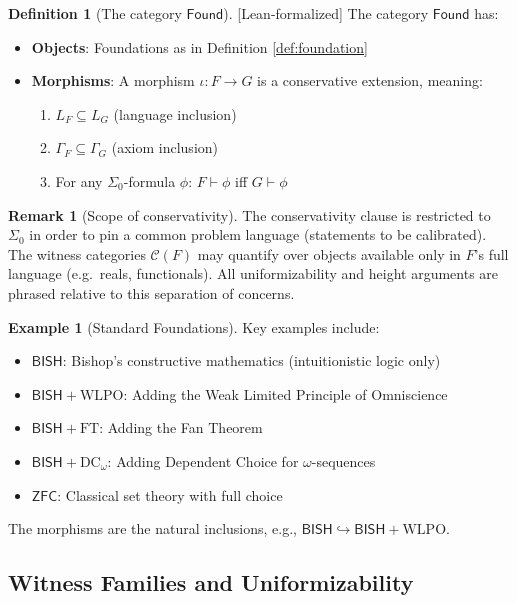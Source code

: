 \documentclass[11pt]{article}
\theoremstyle{plain}
\theoremstyle{definition}
\newtheorem{definition}[theorem]{Definition}
\newtheorem{example}[theorem]{Example}
\newtheorem{remark}[theorem]{Remark}
\newcommand{\WLPO}{\mathrm{WLPO}}
\newcommand{\FT}{\mathrm{FT}}
\newcommand{\DCw}{\mathrm{DC}_\omega}
\newcommand{\BISH}{\mathsf{BISH}}
\newcommand{\ZFC}{\mathsf{ZFC}}
\newcommand{\Found}{\mathsf{Found}}
\newcommand{\SigmaZero}{\Sigma_{0}}
\newcommand{\leanok}{\textsf{\textcolor{green!70!black}{[Lean-formalized]}}}
\begin{document}
\begin{definition}[The category $\Found$] \leanok
The category $\Found$ has:
\begin{itemize}
\item \textbf{Objects}: Foundations as in Definition \ref{def:foundation}
\item \textbf{Morphisms}: A morphism $\iota: F \to G$ is a conservative extension, meaning:
  \begin{enumerate}
  \item $L_F \subseteq L_G$ (language inclusion)
  \item $\Gamma_F \subseteq \Gamma_G$ (axiom inclusion)
  \item For any $\SigmaZero$-formula $\phi$: $F \vdash \phi$ iff $G \vdash \phi$
  \end{enumerate}
\end{itemize}
\end{definition}

\begin{remark}[Scope of conservativity]\label{rem:conservativity-scope}
The conservativity clause is restricted to $\SigmaZero$ in order to pin a common problem language (statements to be calibrated). The witness categories $\mathcal C(F)$ may quantify over objects available only in $F$'s full language (e.g.\ reals, functionals). All uniformizability and height arguments are phrased relative to this separation of concerns.
\end{remark}

\begin{example}[Standard Foundations]
Key examples include:
\begin{itemize}
\item $\BISH$: Bishop's constructive mathematics (intuitionistic logic only)
\item $\BISH + \WLPO$: Adding the Weak Limited Principle of Omniscience
\item $\BISH + \FT$: Adding the Fan Theorem
\item $\BISH + \DCw$: Adding Dependent Choice for $\omega$-sequences
\item $\ZFC$: Classical set theory with full choice
\end{itemize}
The morphisms are the natural inclusions, e.g., $\BISH \hookrightarrow \BISH + \WLPO$.
\end{example}

\subsection{Witness Families and Uniformizability}
\end{document}
